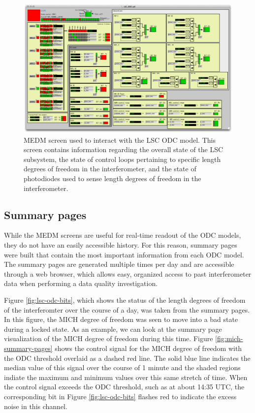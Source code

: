 \begin{figure}[ht!]
\includegraphics[width=\textwidth]{figures/ODC/LSC_screen}
\caption[LSC ODC Overview Screen]{MEDM screen used to interact with the LSC ODC model. %
         This screen contains information regarding the overall state of the LSC subsystem, %
         the state of control loops pertaining to specific length degrees of freedom in the %
         interferometer, and the state of photodiodes used to sense length degrees of freedom %
         in the interferometer.}
\label{fig:lsc-odc}
\end{figure}

\subsection{Summary pages}

While the MEDM screens are useful for real-time readout of the ODC models, they do not 
have an easily accessible history. For this reason, summary pages were built that 
contain the most important information from each ODC model. The summary pages are 
generated multiple times per day and are accessible through a web browser, which allows 
easy, organized access to past interferometer data when performing a data 
quality investigation. 

Figure \ref{fig:lsc-odc-bits}, which shows the status of the length degrees of freedom 
of the interferomter over the course of a day, was taken from the summary pages. In this 
figure, the MICH degree of freedom was seen to move into a bad state during a locked state. 
As an example, we can look at the summary page visualization of the MICH degree of freedom 
during this time. 
Figure \ref{fig:mich-summary-pages} shows the control signal for the MICH degree of freedom 
with the ODC threshold 
overlaid as a dashed red line. The solid blue line indicates the median value of this signal 
over the course of 1 minute and the shaded regions indiate the maximum and minimum values over 
this same stretch of time. When the control signal exceeds the ODC threshold, such as at 
about 14:35 UTC, the corresponding bit in Figure \ref{fig:lsc-odc-bits} flashes red to 
indicate the excess noise in this channel. 

